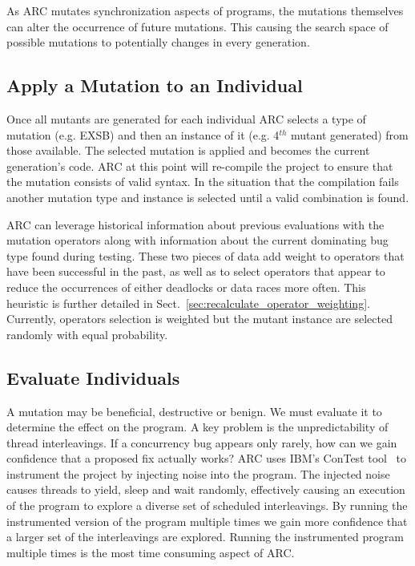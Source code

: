 As ARC mutates synchronization aspects of programs, the mutations themselves
can alter the occurrence of future mutations. This causing the search space of
possible mutations to potentially changes in every generation.


\subsection{Apply a Mutation to an Individual}
\label{sec:mutate_individuals}

Once all mutants are generated for each individual ARC selects a type of
mutation (e.g. EXSB) and then an instance of it (e.g. 4$^{th}$ mutant
generated) from those available. The selected mutation is applied and becomes
the current generation's code. ARC at this point will re-compile the project to
ensure that the mutation consists of valid syntax. In the situation that the
compilation fails another mutation type and instance is selected until a valid
combination is found.

ARC can leverage historical information about previous evaluations with the
mutation operators along with information about the current dominating bug type
found during testing. These two pieces of data add weight to operators that
have been successful in the past, as well as to select operators that appear to
reduce the occurrences of either deadlocks or data races more often. This
heuristic is further detailed in
Sect.~\ref{sec:recalculate_operator_weighting}. Currently, operators selection
is weighted but the mutant instance are selected randomly with equal
probability.

\subsection{Evaluate Individuals}
\label{sec:evalute_individuals}

A mutation may be beneficial, destructive or benign. We must evaluate it to
determine the effect on the program. A key problem is the unpredictability of
thread interleavings. If a concurrency bug appears only rarely, how can we gain
confidence that a proposed fix actually works? ARC uses IBM's ConTest
tool~\cite{EFN+02} to instrument the project by injecting noise into the
program. The injected noise causes threads to yield, sleep and wait randomly,
effectively causing an execution of the program to explore a diverse set of
scheduled interleavings. By running the instrumented version of the program
multiple times we gain more confidence that a larger set of the interleavings
are explored. Running the instrumented program multiple times is the most time
consuming aspect of ARC.

